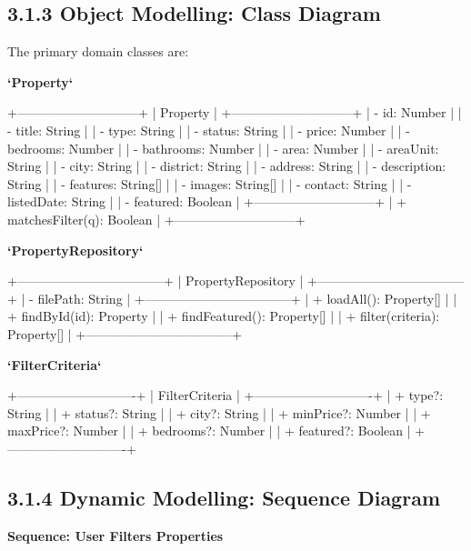 \documentclass[12pt,a4paper]{report}
\begin{document}
\subsection{3.1.3 Object Modelling: Class Diagram}
The primary domain classes are:

\textbf{`Property`}

+-----------------------------+
|         Property            |
+-----------------------------+
| - id: Number                |
| - title: String             |
| - type: String              |
| - status: String            |
| - price: Number             |
| - bedrooms: Number          |
| - bathrooms: Number         |
| - area: Number              |
| - areaUnit: String          |
| - city: String              |
| - district: String          |
| - address: String           |
| - description: String       |
| - features: String[]        |
| - images: String[]          |
| - contact: String           |
| - listedDate: String        |
| - featured: Boolean         |
+-----------------------------+
| + matchesFilter(q): Boolean |
+-----------------------------+

\textbf{`PropertyRepository`}

+-----------------------------------+
|       PropertyRepository          |
+-----------------------------------+
| - filePath: String                |
+-----------------------------------+
| + loadAll(): Property[]           |
| + findById(id): Property          |
| + findFeatured(): Property[]      |
| + filter(criteria): Property[]    |
+-----------------------------------+

\textbf{`FilterCriteria`}

+----------------------------+
|       FilterCriteria       |
+----------------------------+
| + type?: String            |
| + status?: String          |
| + city?: String            |
| + minPrice?: Number        |
| + maxPrice?: Number        |
| + bedrooms?: Number        |
| + featured?: Boolean       |
+----------------------------+

\subsection{3.1.4 Dynamic Modelling: Sequence Diagram}
\textbf{Sequence: User Filters Properties}
\end{document}

